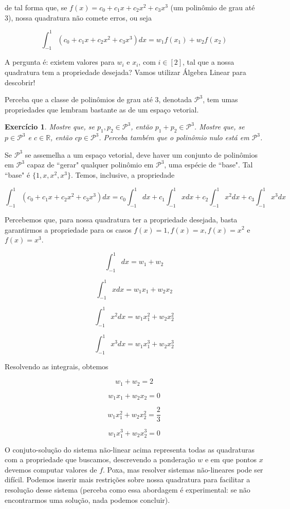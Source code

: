 \documentclass[]{article}
\newtheorem{exercicio}{Exercício}
\numberwithin{equation}{section}
\begin{document}
de tal forma que, se $f(x) = c_0 + c_1x + c_2x^2 + c_3x^3$ (um polinômio de grau até 3), nossa quadratura não comete erros, ou seja

$$
\int_{-1}^{1} (c_0 + c_1x + c_2x^2 + c_3x^3) dx = w_1 f(x_1) + w_2 f(x_2)
$$

A pergunta é: existem valores para $w_i$ e $x_i$, com $i \in [2]$, tal que a nossa quadratura tem a propriedade desejada? Vamos utilizar Álgebra Linear para descobrir!

Perceba que a classe de polinômios de grau até 3, denotada $\mathcal{P}^3$, tem umas propriedades que lembram bastante as de um espaço vetorial.

\begin{exercicio}
	Mostre que, se $p_1, p_2 \in \mathcal{P}^3$, então $p_1 + p_2 \in \mathcal{P}^3$. Mostre que, se $p \in \mathcal{P}^3$ e $c \in \mathbb{R}$, então $cp \in \mathcal{P}^3$. Perceba também que o polinômio nulo está em $\mathcal{P}^3$.
\end{exercicio}

Se $\mathcal{P}^3$ se assemelha a um espaço vetorial, deve haver um conjunto de polinômios em $\mathcal{P}^3$ capaz de ``gerar" qualquer polinômio em $\mathcal{P}^3$, uma espécie de ``base". Tal ``base" é $\{1, x, x^2, x^3\}$. Temos, inclusive, a propriedade

$$
\int_{-1}^{1} (c_0 + c_1x + c_2x^2 + c_3x^3) dx = c_0\int_{-1}^{1} dx + c_1\int_{-1}^{1} x dx + c_2\int_{-1}^{1} x^2 dx + c_3\int_{-1}^{1} x^3 dx
$$

Percebemos que, para nossa quadratura ter a propriedade desejada, basta garantirmos a propriedade para os casos $f(x) = 1, f(x) = x, f(x) = x^2$ e $f(x) = x^3$.

$$
\int_{-1}^{1} dx = w_1 + w_2
$$

$$
\int_{-1}^{1} x dx = w_1 x_1 + w_2 x_2
$$

$$
\int_{-1}^{1} x^2 dx = w_1 x_1^2 + w_2 x_2^2
$$

$$
\int_{-1}^{1} x^3 dx = w_1 x_1^3 + w_2 x_2^3
$$

Resolvendo as integrais, obtemos

$$
w_1 + w_2 = 2
$$

$$
w_1 x_1 + w_2 x_2 = 0
$$

$$
w_1 x_1^2 + w_2 x_2^2 = \frac{2}{3}
$$

$$
w_1 x_1^3 + w_2 x_2^3 = 0
$$

O conjuto-solução do sistema não-linear acima representa todas as quadraturas com a propriedade que buscamos, descrevendo a ponderação $w$ e em que pontos $x$ devemos computar valores de $f$. Poxa, mas resolver sistemas não-lineares pode ser difícil. Podemos inserir mais restrições sobre nossa quadratura para facilitar a resolução desse sistema (perceba como essa abordagem é experimental: se não encontrarmos uma solução, nada podemos concluir).
\end{document}
